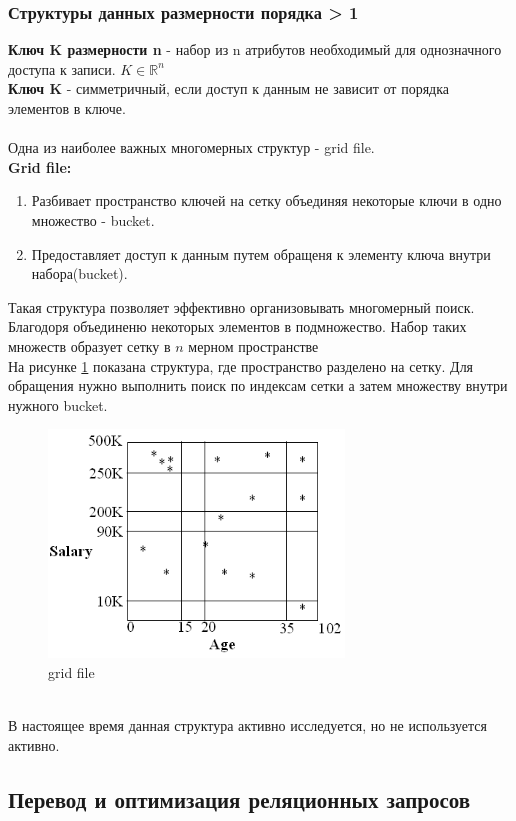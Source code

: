 \documentclass{article}
\begin{document}
\subsubsection{Структуры данных размерности порядка > 1}
\textbf{Ключ K размерности n} - набор из n атрибутов необходимый для однозначного доступа к записи. $K \in \mathbb{R}^n$\\
\textbf{Ключ K} - симметричный, если доступ к данным не зависит от порядка элементов в ключе.\\\\
Одна из наиболее важных многомерных структур - grid file.\\
\textbf{Grid file:}
\begin{enumerate}
    \item Разбивает пространство ключей на сетку объединяя некоторые ключи в одно множество - bucket.
    \item Предоставляет доступ к данным путем обращеня к элементу ключа внутри набора(bucket).
\end{enumerate}
Такая структура позволяет эффективно организовывать многомерный поиск. Благодоря объединеню некоторых элементов в подмножество. Набор таких множеств образует сетку в $n$ мерном пространстве\\
На рисунке \ref{img4} показана структура, где пространство разделено на сетку. Для обращения нужно выполнить поиск по индексам сетки а затем множеству внутри нужного bucket.
\begin{figure}[h]
    \centering
    \includegraphics[width=0.7\textwidth]{images/grid.png}
    \caption{grid file}
    \label{img4}
\end{figure}
\\
В настоящее время данная структура активно исследуется, но не используется активно.


\subsection{Перевод и оптимизация реляционных запросов}
\end{document}
